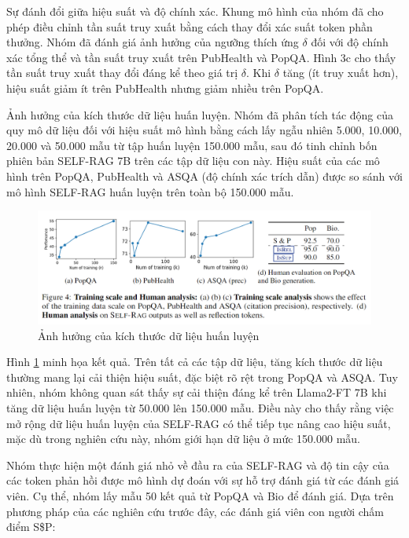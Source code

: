 \documentclass{article}
\begin{document}
Sự đánh đổi giữa hiệu suất và độ chính xác. Khung mô hình của nhóm đã cho phép điều chỉnh tần suất truy xuất bằng cách thay đổi xác suất token phần thưởng. Nhóm đã đánh giá ảnh hưởng của ngưỡng thích ứng $\delta$ đối với độ chính xác tổng thể và tần suất truy xuất trên PubHealth và PopQA. Hình 3c cho thấy tần suất truy xuất thay đổi đáng kể theo giá trị $\delta$. Khi $\delta$ tăng (ít truy xuất hơn), hiệu suất giảm ít trên PubHealth nhưng giảm nhiều trên PopQA.

Ảnh hưởng của kích thước dữ liệu huấn luyện. Nhóm đã phân tích tác động của quy mô dữ liệu đối với hiệu suất mô hình bằng cách lấy ngẫu nhiên 5.000, 10.000, 20.000 và 50.000 mẫu từ tập huấn luyện 150.000 mẫu, sau đó tinh chỉnh bốn phiên bản SELF-RAG 7B trên các tập dữ liệu con này. Hiệu suất của các mô hình trên PopQA, PubHealth và ASQA (độ chính xác trích dẫn) được so sánh với mô hình SELF-RAG huấn luyện trên toàn bộ 150.000 mẫu.

\begin{figure} 
    \centering
    \includegraphics[scale = 0.7]{training_scale.png}
    \caption{Ảnh hưởng của kích thước dữ liệu huấn luyện}
    \label{fig:training_scale}
\end{figure}

Hình \ref{fig:training_scale} minh họa kết quả. Trên tất cả các tập dữ liệu, tăng kích thước dữ liệu thường mang lại cải thiện hiệu suất, đặc biệt rõ rệt trong PopQA và ASQA. Tuy nhiên, nhóm không quan sát thấy sự cải thiện đáng kể trên Llama2-FT 7B khi tăng dữ liệu huấn luyện từ 50.000 lên 150.000 mẫu. Điều này cho thấy rằng việc mở rộng dữ liệu huấn luyện của SELF-RAG có thể tiếp tục nâng cao hiệu suất, mặc dù trong nghiên cứu này, nhóm giới hạn dữ liệu ở mức 150.000 mẫu.

Nhóm thực hiện một đánh giá nhỏ về đầu ra của SELF-RAG và độ tin cậy của các token phản hồi được mô hình dự đoán với sự hỗ trợ đánh giá từ các đánh giá viên. Cụ thể, nhóm lấy mẫu 50 kết quả từ PopQA và Bio để đánh giá. Dựa trên phương pháp của các nghiên cứu trước đây, các đánh giá viên con người chấm điểm S\$P:
\end{document}
